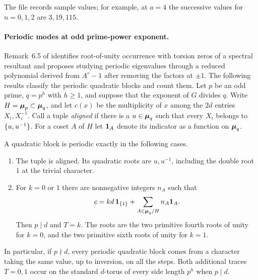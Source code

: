 The file  records
sample values; for example, at $a=4$ the successive values for $n=0,1,2$
are $3,19,115$.

\paragraph{Periodic modes at odd prime-power exponent.}
Remark~6.5 of \cite{AkahoriHayashiSuzuki2026Grover} identifies root-of-unity occurrence
with torsion zeros of a spectral resultant and proposes studying periodic eigenvalues
through a reduced polynomial derived from $A^r-1$ after removing the factors at $\pm1$.
The following results classify the periodic quadratic blocks and count them. Let $p$ be an
odd prime, $q=p^h$ with $h\ge1$, and suppose that the exponent of $G$ divides $q$. Write
$H=\boldsymbol{\mu}_p\subset\boldsymbol{\mu}_q$, and let $c(x)$ be the multiplicity of $x$ among the $2d$
entries $X_i,X_i^{-1}$. Call a tuple \emph{aligned} if there is a $u\in\boldsymbol{\mu}_q$ such that
every $X_i$ belongs to $\{u,u^{-1}\}$. For a coset $A$ of $H$ let $\mathbf{1}_A$ denote its
indicator as a function on $\boldsymbol{\mu}_q$.

\begin{theorem}\label{gra:thm:groverodd}
A quadratic block is periodic exactly in the following cases.
\begin{enumerate}[label=\textup{(\arabic*)}]
\item The tuple is aligned. Its quadratic roots are $u,u^{-1}$, including the double
  root $1$ at the trivial character.
\item For $k=0$ or $1$ there are nonnegative integers $n_A$ such that
  \[
   c=kd\,\mathbf{1}_{\{1\}}+\sum_{A\in\boldsymbol{\mu}_q/H}n_A\mathbf{1}_A .
  \]
  Then $p\mid d$ and $T=k$. The roots are the two primitive fourth roots of unity for
  $k=0$, and the two primitive sixth roots of unity for $k=1$.
\end{enumerate}
In particular, if $p\nmid d$, every periodic quadratic block comes from a character taking
the same value, up to inversion, on all the steps. Both additional traces $T=0,1$ occur
on the standard $d$-torus of every side length $p^h$ when $p\mid d$.
\end{theorem}

